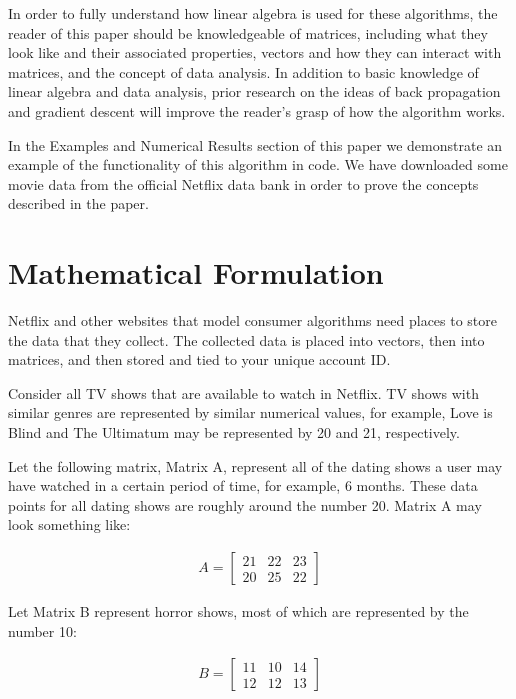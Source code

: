 \documentclass[11pt,a4paper]{article}
\begin{document}
In order to fully understand how linear algebra is used for these algorithms, the reader of this paper should be knowledgeable of matrices, including what they look like and their associated properties, vectors and how they can interact with matrices, and the concept of data analysis. In addition to basic knowledge of linear algebra and data analysis, prior research on the ideas of back propagation and gradient descent will improve the reader's grasp of how the algorithm works.

In the Examples and Numerical Results section of this paper we demonstrate an example of the functionality of this algorithm in code. We have downloaded some movie data from the official Netflix data bank in order to prove the concepts described in the paper.



\section{Mathematical Formulation}

Netflix and other websites that model consumer algorithms need places to store the data that they collect. The collected data is placed into vectors, then into matrices, and then stored and tied to your unique account ID.

Consider all TV shows that are available to watch in Netflix. TV shows with similar genres are represented by similar numerical values, for example, Love is Blind and The Ultimatum may be represented by 20 and 21, respectively.

Let the following matrix, Matrix A, represent all of the dating shows a user may have watched in a certain period of time, for example, 6 months. These data points for all dating shows are roughly around the number 20. Matrix A may look something like:

\begin{align*}
    A = \begin{bmatrix}
            21 & 22 & 23 \\
            20 & 25 & 22
        \end{bmatrix}
\end{align*}

Let Matrix B represent horror shows, most of which are represented by the number 10:

\begin{align*}
    B = \begin{bmatrix}
            11 & 10 & 14 \\
            12 & 12 & 13
        \end{bmatrix}
\end{align*}
\end{document}
